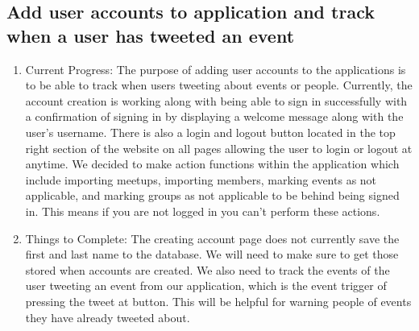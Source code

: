 \documentclass[letterpaper,10pt,onecolumn]{IEEEtran} %
\begin{document}
\subsection{Add user accounts to application and track when a user has tweeted an event}
\begin{enumerate}[label*=\arabic*.]
\item Current Progress: The purpose of adding user accounts to the applications is to be able to track when users tweeting about events or people. Currently, the account creation is working along with being able to sign in successfully with a confirmation of signing in by displaying a welcome message along with the user's username. There is also a login and logout button located in the top right section of the website on all pages allowing the user to login or logout at anytime. We decided to make action functions within the application which include importing meetups, importing members, marking events as not applicable, and marking groups as not applicable to be behind being signed in. This means if you are not logged in you can't perform these actions.
 

\item Things to Complete: The creating account page does not currently save the first and last name to the database. We will need to make sure to get those stored when accounts are created. We also need to track the events of the user tweeting an event from our application, which is the event trigger of pressing the tweet at button. This will be helpful for warning people of events they have already tweeted about.


\end{enumerate}
\end{document}

